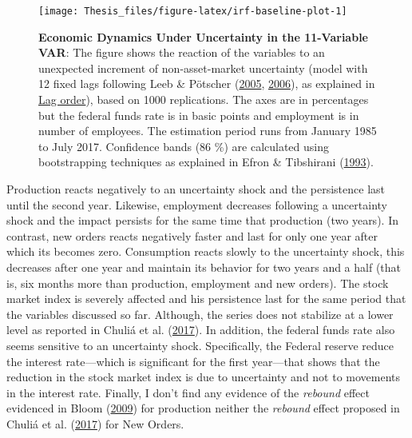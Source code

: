 \documentclass[12pt,twoside]{reedthesis}
\begin{document}
\begin{figure}

{\centering \texttt{[image: Thesis\_files/figure-latex/irf-baseline-plot-1]} 

}

\caption[Economic Dynamics Under Uncertainty in the 11-Variable VAR]{\textbf{Economic Dynamics Under Uncertainty in the 11-Variable VAR}: The figure shows the reaction of the variables to an unexpected increment of non-asset-market uncertainty (model with 12 fixed lags following Leeb \& Pötscher (\protect\hyperlink{ref-leebpots:2005}{2005}, \protect\hyperlink{ref-leebpots:2006}{2006}), as explained in \protect\hyperlink{lag-order}{Lag order}), based on 1000 replications. The axes are in percentages but the federal funds rate is in basic points and employment is in number of employees. The estimation period runs from January 1985 to July 2017. Confidence bands (86 \%) are calculated using bootstrapping techniques as explained in Efron \& Tibshirani (\protect\hyperlink{ref-efrotibs:1993}{1993}).}\label{fig:irf-baseline-plot}
\end{figure}
Production reacts negatively to an uncertainty shock and the persistence last until the second year. Likewise, employment decreases following a uncertainty shock and the impact persists for the same time that production (two years). In contrast, new orders reacts negatively faster and last for only one year after which its becomes zero. Consumption reacts slowly to the uncertainty shock, this decreases after one year and maintain its behavior for two years and a half (that is, six months more than production, employment and new orders). The stock market index is severely affected and his persistence last for the same period that the variables discussed so far. Although, the series does not stabilize at a lower level as reported in Chuliá et al. (\protect\hyperlink{ref-chulguilurib:2017}{2017}). In addition, the federal funds rate also seems sensitive to an uncertainty shock. Specifically, the Federal reserve reduce the interest rate---which is significant for the first year---that shows that the reduction in the stock market index is due to uncertainty and not to movements in the interest rate. Finally, I don't find any evidence of the \emph{rebound} effect evidenced in Bloom (\protect\hyperlink{ref-bloom:2009}{2009}) for production neither the \emph{rebound} effect proposed in Chuliá et al. (\protect\hyperlink{ref-chulguilurib:2017}{2017}) for New Orders.
\end{document}
